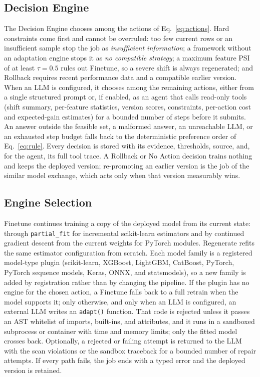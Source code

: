 \documentclass[conference]{IEEEtran}
\begin{document}
\subsection{Decision Engine}
The Decision Engine chooses among the actions of Eq.~\eqref{eq:actions}. Hard constraints come
first and cannot be overruled: too few current rows or an insufficient sample stop the job as
\emph{insufficient information}; a framework without an adaptation engine stops it as \emph{no
compatible strategy}; a maximum feature PSI of at least $\tau = 0.5$ rules out Finetune, so a
severe shift is always regenerated; and Rollback requires recent performance data and a
compatible earlier version. When an LLM is configured, it chooses among the remaining actions,
either from a single structured prompt or, if enabled, as an agent that calls read-only tools
(shift summary, per-feature statistics, version scores, constraints, per-action cost and
expected-gain estimates) for a bounded number of steps before it submits. An answer outside the
feasible set, a malformed answer, an unreachable LLM, or an exhausted step budget falls back to
the deterministic preference order of Eq.~\eqref{eq:rule}. Every decision is stored with its
evidence, thresholds, source, and, for the agent, its full tool trace. A Rollback or No Action
decision trains nothing and keeps the deployed version; re-promoting an earlier version is the
job of the similar model exchange, which acts only when that version measurably wins.

\subsection{Engine Selection}
Finetune continues training a copy of the deployed model from its current state: through
\texttt{partial\_fit} for incremental scikit-learn estimators and by continued gradient descent
from the current weights for PyTorch modules. Regenerate refits the same estimator
configuration from scratch. Each model family is a registered model-type plugin (scikit-learn,
XGBoost, LightGBM, CatBoost, PyTorch, PyTorch sequence models, Keras, ONNX, and statsmodels), so
a new family is added by registration rather than by changing the pipeline. If the plugin has no
engine for the chosen action, a Finetune falls back to a full retrain when the model supports
it; only otherwise, and only when an LLM is configured, an external LLM writes an
\texttt{adapt()} function. That code is rejected unless it passes an AST whitelist of imports,
built-ins, and attributes, and it runs in a sandboxed subprocess or container with time and
memory limits; only the fitted model crosses back. Optionally, a rejected or failing attempt is
returned to the LLM with the scan violations or the sandbox traceback for a bounded number of
repair attempts. If every path fails, the job ends with a typed error and the deployed version
is retained.
\end{document}
